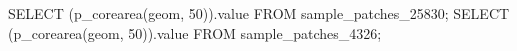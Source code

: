 \lstset{caption=Crear una función para calcular el IDW (I),label= IDW1}
\begin{SQL}
SELECT (p_corearea(geom, 50)).value FROM sample_patches_25830;
SELECT (p_corearea(geom, 50)).value FROM sample_patches_4326;
\end{SQL}
